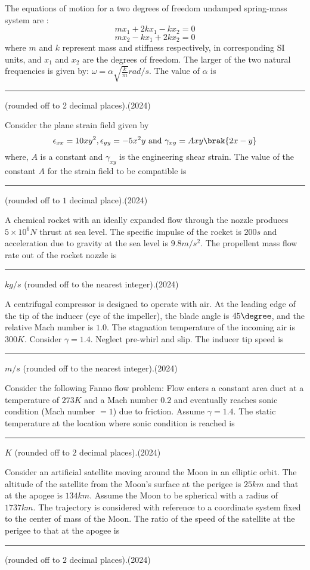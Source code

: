 \item The equations of motion for a two degrees of freedom undamped spring-mass system are : $$mx_{1}+2kx_{1}-kx_{2}=0$$ $$mx_{2}-kx_{1}+2kx_{2}=0$$ where $m$ and $k$ represent mass and stiffness respectively, in corresponding SI units, and $x_{1}$ and $x_{2}$ are the degrees of freedom. The larger of the two natural frequencies is given by: $\omega=\alpha\sqrt{\frac{k}{m}}rad/s$. The value of $\alpha$ is \rule{1cm}{0.15mm} (rounded off to 2 decimal places).\hfill(2024)


\item Consider the plane strain field given by $$\epsilon_{xx}=10xy^{2},\epsilon_{yy}=-5x^{2}y\text{ and }\gamma_{xy}=Axy\brak{2x-y}$$ where, $A$ is a constant and $\gamma_{xy}$ is the engineering shear strain. The value of the constant $A$ for the strain field to be compatible is \rule{1cm}{0.15mm} (rounded off to $1$ decimal place).\hfill(2024)


\item A chemical rocket with an ideally expanded flow through the nozzle produces $5\times 10^{6}N$ thrust at sea level. The specific impulse of the rocket is $200s$ and acceleration due to gravity at the sea level is $9.8m/s^{2}$. The propellent mass flow rate out of the rocket nozzle is \rule{1cm}{0.15mm} $kg/s$ (rounded off to the nearest integer).\hfill(2024)


\item A centrifugal compressor is designed to operate with air. At the leading edge of the tip of the inducer (eye of the impeller), the blade angle is $45\degree$, and the relative Mach number is $1.0$. The stagnation temperature of the incoming air is $300K$. Consider $\gamma=1.4$. Neglect pre-whirl and slip. The inducer tip speed is \rule{1cm}{0.15mm} $m/s$ (rounded off to the nearest integer).\hfill(2024)


\item Consider the following Fanno flow problem: Flow enters a constant area duct at a temperature of $273K$ and a Mach number $0.2$ and eventually reaches sonic condition (Mach number $=1$) due to friction. Assume $\gamma=1.4$. The static temperature at the location where sonic condition is reached is \rule{1cm}{0.15mm} $K$ (rounded off to $2$ decimal places).\hfill(2024)


\item Consider an artificial satellite moving around the Moon in an elliptic orbit. The altitude of the satellite from the Moon's surface at the perigee is $25km$ and that at the apogee is $134km$. Assume the Moon to be spherical with a radius of $1737km$. The trajectory is considered with reference to a coordinate system fixed to the center of mass of the Moon. The ratio of the speed of the satellite at the perigee to that at the apogee is \rule{1cm}{0.15mm} (rounded off to $2$ decimal places).\hfill(2024)


